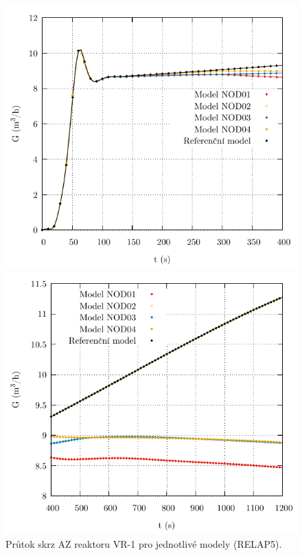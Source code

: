 \begin{figure}[H]
	\centering
	\begin{minipage}{.5\textwidth}
		\centering
		\includegraphics[width=\textwidth]{./06_hodnoceni_TH_modelu/grafy/G_stationary_100_trans.pdf}
	\end{minipage}%
	\begin{minipage}{.5\textwidth}
		\centering
		\includegraphics[width=\linewidth]{./06_hodnoceni_TH_modelu/grafy/G_stationary_100.pdf}
		
	\end{minipage}
	\caption{Průtok skrz AZ reaktoru VR-1 pro jednotlivé modely (RELAP5).}
	\label{fig:G_stationary_100}
\end{figure}

